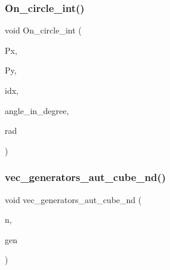\subsubsection{\texorpdfstring{On\+\_\+circle\+\_\+int()}{On\_circle\_int()}}
{\footnotesize\ttfamily void On\+\_\+circle\+\_\+int (\begin{DoxyParamCaption}\item[{\mbox{\hyperlink{class_vector}{Vector}} \&}]{Px,  }\item[{\mbox{\hyperlink{class_vector}{Vector}} \&}]{Py,  }\item[{\mbox{\hyperlink{galois_8h_a09fddde158a3a20bd2dcadb609de11dc}{I\+NT}}}]{idx,  }\item[{\mbox{\hyperlink{galois_8h_a09fddde158a3a20bd2dcadb609de11dc}{I\+NT}}}]{angle\+\_\+in\+\_\+degree,  }\item[{\mbox{\hyperlink{galois_8h_a09fddde158a3a20bd2dcadb609de11dc}{I\+NT}}}]{rad }\end{DoxyParamCaption})}

\mbox{\label{solid_8_c_a6667c4c5a108f8dff507f759073e6f80}} 
\subsubsection{\texorpdfstring{vec\+\_\+generators\+\_\+aut\+\_\+cube\+\_\+nd()}{vec\_generators\_aut\_cube\_nd()}}
{\footnotesize\ttfamily void vec\+\_\+generators\+\_\+aut\+\_\+cube\+\_\+nd (\begin{DoxyParamCaption}\item[{\mbox{\hyperlink{galois_8h_a09fddde158a3a20bd2dcadb609de11dc}{I\+NT}}}]{n,  }\item[{\mbox{\hyperlink{class_vector}{Vector}} \&}]{gen }\end{DoxyParamCaption})}

